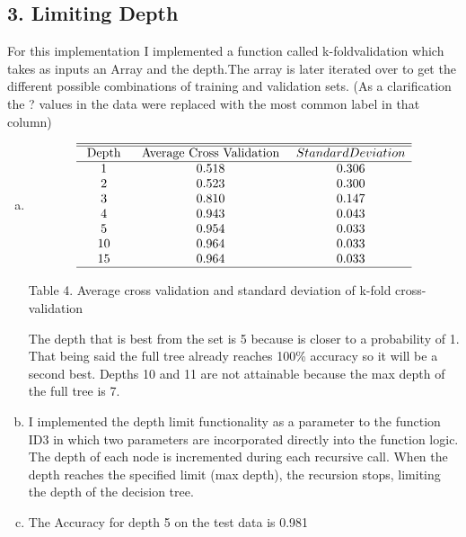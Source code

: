 \documentclass[11pt]{article}
\begin{document}
\subsection*{3. Limiting Depth}

	For this implementation I implemented a function called k-foldvalidation which takes as inputs an Array and the depth.The array is later iterated over to get the different possible combinations of training and validation sets. (As a clarification the ? values in the data were replaced with the most common label in that column)   
	\begin{enumerate}[(a)]
		
		\item \begin{align}
			\begin{array}{ccc}
				\hline \hline \text { Depth } & \text { Average Cross Validation } & {Standard Deviation} \\
				\hline 
				1 & 0.518 & 0.306\\
				2 & 0.523 & 0.300\\
				3 & 0.810 & 0.147\\
				4 & 0.943 & 0.043\\
				5 & 0.954 & 0.033\\
				10 & 0.964 & 0.033 \\
				15 & 0.964 & 0.033  \\
				\hline
			\end{array}
		\end{align}
		\begin{center} Table 4. Average cross validation and standard deviation of k-fold cross-validation  \end{center}
		The depth that is best from the set is 5 because is closer to a probability of 1. That being said the full tree already reaches 100\% accuracy so it will be a second best. Depths 10 and 11 are not attainable because the max depth of the full tree is 7.
		 
		\item  I implemented the depth limit functionality as a parameter to the function ID3 in which  two parameters are incorporated directly into the function logic. The depth of each node is incremented during each recursive call. When the depth reaches the specified limit (max depth), the recursion stops, limiting the depth of the decision tree.
		
		\item  The Accuracy for depth 5 on the test data is 0.981
		

\end{enumerate}
\end{document}
